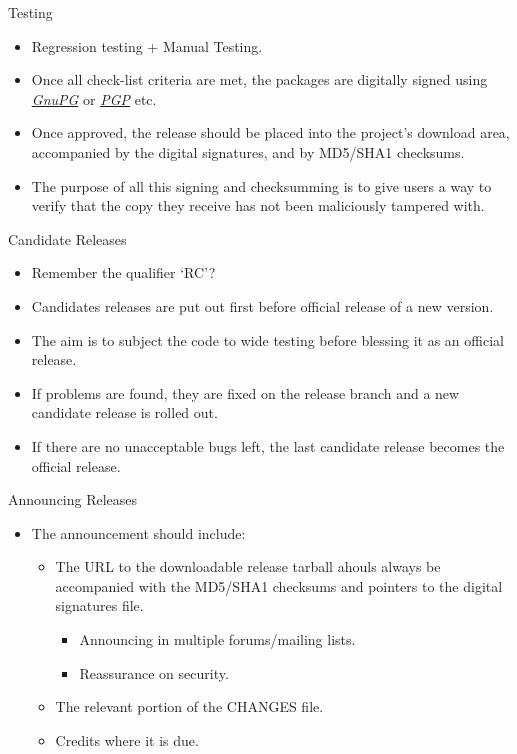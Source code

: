 \documentclass{beamer}
\begin{document}
\begin{frame}{Testing}
\begin{itemize}
	\item Regression testing + Manual Testing. 
	\item Once all check-list criteria are met, the packages are digitally signed using \emph{\href{http://www.gnupg.org/}{GnuPG}} or \emph{\href{http://www.pgpi.org/}{PGP}} etc. 
	\item Once approved, the release should be placed into the project's download area, accompanied by the digital signatures, and by MD5/SHA1 checksums.
	\item The purpose of all this signing and checksumming is to give users a way to verify that the copy they receive has not been maliciously tampered with.
\end{itemize}
\end{frame}

\begin{frame}{Candidate Releases}
\begin{itemize}
	\item Remember the qualifier `RC'? 
	\item Candidates releases are put out first before official release of a new version. 
	\item The aim is to subject the code to wide testing before blessing it as an official release. 
	\item If problems are found, they are fixed on the release branch and a new candidate release is rolled out. 
	\item If there are no unacceptable bugs left, the last candidate release becomes the official release.
\end{itemize}
\end{frame}

\begin{frame}{Announcing Releases}
\begin{itemize}
	\item The announcement should include:
	\begin{itemize}
		\item The URL to the downloadable release tarball ahouls always be accompanied with the MD5/SHA1 checksums and pointers to the digital signatures file. 
		\begin{itemize}
			\item Announcing in multiple forums/mailing lists.
			\item Reassurance on security.
		\end{itemize} 
		\item The relevant portion of the CHANGES file. 
		\item Credits where it is due.
	\end{itemize}
\end{itemize}
\end{frame}
\end{document}
